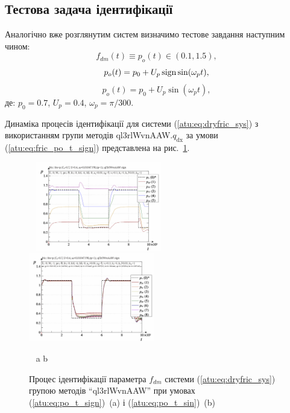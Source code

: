 

\subsection{Тестова задача ідентифікації} %

Аналогічно вже розглянутим систем визначимо тестове завдання
наступним чином:
\[
  f_{dm}(t) \equiv p_o(t) \in (0.1, 1.5),
\]
%
\begin{equation}
  p_o(t) = p_0 +  U_{p} \operatorname*{sign} \sin( \omega_{p} t ),
  \label{atu:eq:fric_po_t_sign}
\end{equation}
%
%
\begin{equation}
  p_o(t) = p_0 +  U_{p} \sin( \omega_{p} t ),
  \label{atu:eq:fric_po_t_sin}
\end{equation}
%
де:
$p_0 = 0.7$, $U_p=0.4$, $\omega_p = \pi / 300$.

Динаміка процесів ідентифікації для системи (\ref{atu:eq:dryfric_sys})
з використанням групи методів ql3rlWvnAAW.$q_\mathrm{dx} $ за умови (\ref{atu:eq:fric_po_t_sign})
представлена на рис.~\ref{atu:f:fric_id_ql3rlWvnAAW_q_dx_sign}.

\begin{figure}[htb!]
  \begin{center}
    ~ \hfill
    \includegraphics[width=0.49\textwidth]{p/cha/fric/ql3rlWvnAAW/fric_id-p_t_pi_ql3rlWvnAAW_sign.png}
    \hfill
    \includegraphics[width=0.49\textwidth]{p/cha/fric/ql3rlWvnAAW/fric_id-p_t_p_ql3rlWvnAAW_sign.png}
    \hfill ~
  \end{center}
  \vspace{-1.5ex}
  \begin{center}
    ~ \hfill a \hfill\hfill b \hfill ~
  \end{center}
  \vspace{-2.5ex}
\caption{
  Процес ідентифікації параметра $f_{dm}$ системи (\ref{atu:eq:dryfric_sys}) групою методів ``ql3rlWvnAAW''
  при умовах (\ref{atu:eq:po_t_sign})~(a) і  (\ref{atu:eq:po_t_sin})~(b)
}
\label{atu:f:fric_id_ql3rlWvnAAW_q_dx_sign}
\end{figure}

